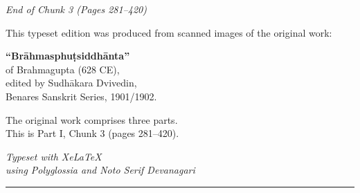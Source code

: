 \documentclass[11pt,a4paper]{article}
\providecommand{\XeLaTeX}{XeLaTeX}
\newcommand{\longline}{\noindent\rule{\textwidth}{0.4pt}}
\theoremstyle{definition}
\begin{document}
\begin{center}
\textit{End of Chunk 3 (Pages 281--420)}
\end{center}

\vspace{1cm}

\begin{center}
\begin{minipage}{0.8\textwidth}
\centering
This typeset edition was produced from scanned images of the original work:

\vspace{0.3cm}
\textbf{``Br\=ahmasphu\d{t}siddh\=anta''}\\
of Brahmagupta (628 CE),\\
edited by Sudh\=akara Dvivedin,\\
Benares Sanskrit Series, 1901/1902.

\vspace{0.5cm}
The original work comprises three parts.\\
This is Part I, Chunk 3 (pages 281--420).

\vspace{0.5cm}
\textit{Typeset with \XeLaTeX\\
using Polyglossia and Noto Serif Devanagari}
\end{minipage}
\end{center}

\vspace{1cm}
\longline
\end{document}
